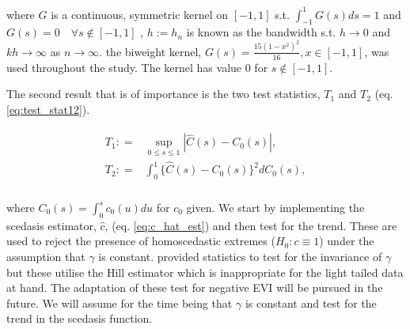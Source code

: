 \noindent where $G$ is a continuous, symmetric kernel on $[-1,1]$ s.t. $\int_{-1}^{1} G(s)ds = 1$ and $G(s) = 0 \quad \forall s \notin [-1,1]$ , $h := h_n$ is known as the bandwidth s.t. $h \rightarrow 0$ and $kh \rightarrow \infty$ as $n \rightarrow \infty$. the biweight kernel, $G(s) = \frac{15(1-x^2)^2}{16}, x \in [-1,1]$, was used throughout the study. The kernel has value 0 for $s \notin [-1,1]$.

The second result that is of importance is the two test statistics, $T_1$ and $T_2$ (eq. \ref{eq:test_stat12}).  

\begin{align} \label{eq:test_stat12}
\begin{split}
T_1 : =& \sup_{0 \le s \le 1} |\hat{C}(s) - C_0(s)|,\\
T_2 : =& \int_0^1 \{\hat{C}(s) - C_0(s)\}^2 dC_0(s),\\
\end{split}
\end{align}

\noindent where $C_0(s) = \int_0^s c_0(u)du$ for $c_0$ given. We start by implementing the scedasis estimator, $\hat{c}$, (eq. \ref{eq:c_hat_est}) and then test for the trend. These are used to reject the presence of homoscedastic extremes ($H_0: c \equiv 1$) under the assumption that $\gamma$ is constant. \cite{einmahl16} provided statistics to test for the invariance of $\gamma$ but these utilise the Hill estimator which is inappropriate for the light tailed data at hand. The adaptation of these test for negative EVI will be pursued in the future. We will assume for the time being that $\gamma$ is constant and test for the trend in the scedasis function.


%

